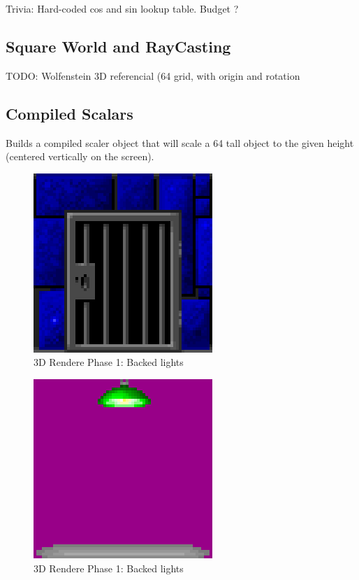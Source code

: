 \documentclass[book.tex]{subfiles}
\begin{document}
Trivia: Hard-coded cos and sin lookup table. Budget ? 

\subsection{Square World and RayCasting}
TODO: Wolfenstein 3D referencial (64 grid, with origin and rotation
\subsection{Compiled Scalars}
Builds a compiled scaler object that will scale a 64 tall object to the given height (centered vertically on the screen).
\\


  \begin{figure}[H]
\centering
 \includegraphics[scale=1.3]{imgs/wall_texturw.png}
 \caption{3D Rendere Phase 1: Backed lights} \label{fig:backee_lights}
 \end{figure}

  \begin{figure}[H]
\centering
 \includegraphics[scale=1.3]{imgs/light_sprite.png}
 \caption{3D Rendere Phase 1: Backed lights} \label{fig:backee_lights}
 \end{figure}
\end{document}
